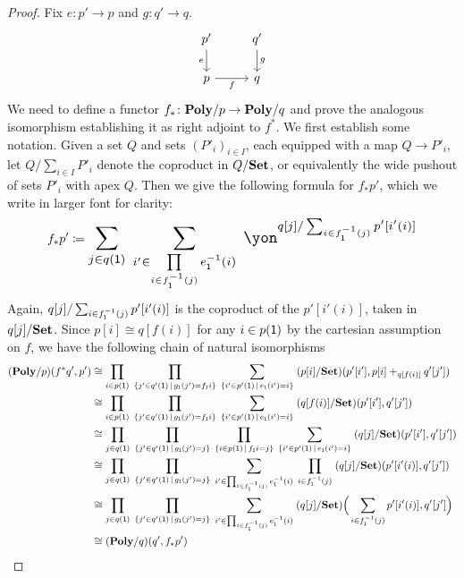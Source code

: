 \documentclass[Book-Poly]{subfiles}
\begin{document}
\begin{proof}
Fix $e\colon p'\to p$ and $g\colon q'\to q$.
\[
\begin{tikzcd}
	p'\ar[d, "e"']&q'\ar[d, "g"]\\
	p\ar[r, "f"']&q
\end{tikzcd}
\]
We need to define a functor $f_*\colon\mathbf{Poly}/p\to\mathbf{Poly}/q$ and prove the analogous isomorphism establishing it as right adjoint to $f^*$. We first establish some notation. Given a set $Q$ and sets $(P'_i)_{i\in I}$, each equipped with a map $Q\to P'_i$, let $Q/\sum_{i\in I}P'_i$ denote the coproduct in $Q/\mathbf{Set}$, or equivalently the wide pushout of sets $P'_i$ with apex $Q$. Then we give the following formula for $f_*p'$, which we write in larger font for clarity:
\begin{equation}\label{eqn.cart_exp}
f_*p'\coloneqq
\scalebox{1.3}{$\displaystyle
\sum_{j\in q(\1)}\;\sum_{i'\in\prod\limits_{i\in f_\1\inv(j)}e_\1\inv(i)}\;\yon^{q[j]/\sum_{i\in f_\1\inv(j)}p'[i'(i)]}
$}
\end{equation}
Again, $q[j]/\sum_{i\in f_{\textsf{1}}^{-1}(j)}p'[i'(i)]$ is the coproduct of the $p'[i'(i)]$, taken in $q[j]/\mathbf{Set}$. Since $p[i]\cong q[f(i)]$ for any $i\in p(\textsf{1})$ by the cartesian assumption on $f$, we have the following chain of natural isomorphisms
\begin{align*}
	(\mathbf{Poly}/p)(f^*q', p')&\cong
	\prod_{i\in p(\textsf{1})}\;\prod_{\{j'\in q'(\textsf{1})\,\mid\,g_{\textsf{1}}(j')=f_{\textsf{1}}i\}}\;\sum_{\{i'\in p'(\textsf{1})\,\mid\,e_{\textsf{1}}(i')=i\}}\;(p[i]/\mathbf{Set})(p'[i'],p[i]+_{q[f(i)]}q'[j'])\\&\cong
	\prod_{i\in p(\textsf{1})}\;\prod_{\{j'\in q'(\textsf{1})\,\mid\,g_{\textsf{1}}(j')=f_{\textsf{1}}i\}}\;\sum_{\{i'\in p'(\textsf{1})\,\mid\,e_{\textsf{1}}(i')=i\}}\;(q[f(i)]/\mathbf{Set})(p'[i'],q'[j'])\\&\cong
	\prod_{j\in q(\textsf{1})}\;\prod_{\{j'\in q'(\textsf{1})\,\mid\, g_{\textsf{1}}(j')=j\}}\;\prod_{\{i\in p(\textsf{1})\,\mid\,f_{\textsf{1}}i=j\}}\;\sum_{\{i'\in p'(\textsf{1})\,\mid\,e_{\textsf{1}}(i')=i\}}\;(q[j]/\mathbf{Set})(p'[i'],q'[j'])\\&\cong
	\prod_{j\in q(\textsf{1})}\;\prod_{\{j'\in q'(\textsf{1})\,\mid\, g_{\textsf{1}}(j')=j\}}\;\sum_{i'\in\prod_{i\in f_{\textsf{1}}^{-1}(j)}e_{\textsf{1}}^{-1}(i)}\;\prod_{i\in f_{\textsf{1}}^{-1}(j)}\;(q[j]/\mathbf{Set})(p'[i'(i)],q'[j'])\\&\cong
	\prod_{j\in q(\textsf{1})}\;\prod_{\{j'\in q'(\textsf{1})\,\mid\, g_{\textsf{1}}(j')=j\}}\;\sum_{i'\in\prod_{i\in f_{\textsf{1}}^{-1}(j)}e_{\textsf{1}}^{-1}(i)}\;(q[j]/\mathbf{Set})\Big(\sum_{i\in f_{\textsf{1}}^{-1}(j)}p'[i'(i)],q'[j']\Big)\\&\cong
	(\mathbf{Poly}/q)(q',f_*p')
\end{align*}
\end{proof}
\end{document}
